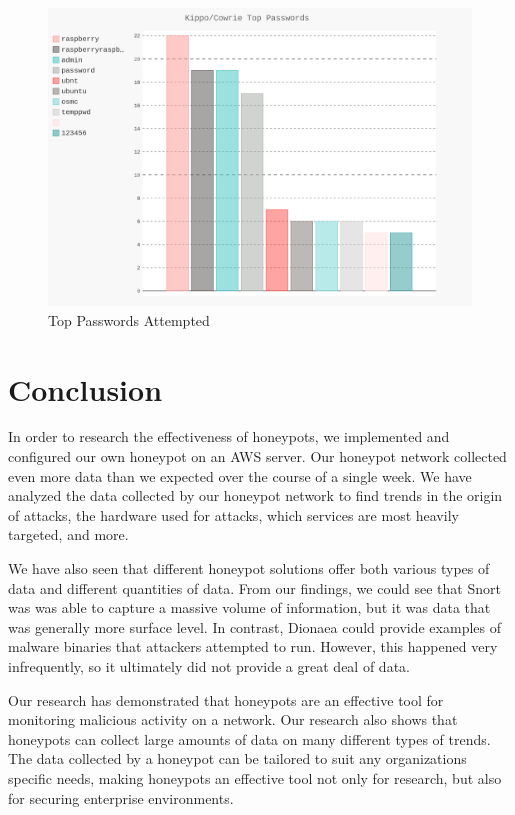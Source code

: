 \documentclass[a0,landscape]{a0poster}
\begin{document}
\begin{multicols}{3}
\begin{figure}[H]
	\begin{center}
		\includegraphics[width=20cm]{images/top_pass.png}
		\caption{Top Passwords Attempted}
	\end{center}
\end{figure}



\section*{Conclusion}
In order to research the effectiveness of honeypots, we implemented and configured our own honeypot on an AWS server. Our honeypot network collected even more data than we expected over the course of a single week. We have analyzed the data collected by our honeypot network to find trends in the origin of attacks, the hardware used for attacks, which services are most heavily targeted, and more. 

We have also seen that different honeypot solutions offer both various types of data and different quantities of data. From our findings, we could see that Snort was was able to capture a massive volume of information, but it was data that was generally more surface level. In contrast, Dionaea could provide examples of malware binaries that attackers attempted to run. However, this happened very infrequently, so it ultimately did not provide a great deal of data.

Our research has demonstrated that honeypots are an effective tool for monitoring malicious activity on a network. Our research also shows that honeypots can collect large amounts of data on many different types of trends. The data collected by a honeypot can be tailored to suit any organizations specific needs, making honeypots an effective tool not only for research, but also for securing enterprise environments. 


\end{multicols}
\end{document}
